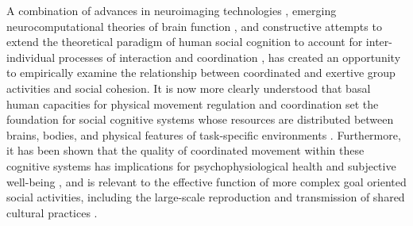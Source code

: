 A combination of advances in neuroimaging technologies \citep{Frith2007}, emerging neurocomputational theories of brain function \citep{Friston2010,Frith2010,Clark2013}, and constructive attempts to extend the theoretical paradigm of human social cognition to account for inter-individual processes of interaction and coordination \citep{Sebanz2006,Dale2014}, has created an opportunity to empirically examine the relationship between coordinated and exertive group activities and social cohesion.  It is now more clearly understood that basal human capacities for physical movement regulation and coordination set the foundation for social cognitive systems whose resources are distributed between brains, bodies, and physical features of task-specific environments \citep{Hutchins2000,Kirsh2006,Semin2008,Semin2012,Coey2012}.  Furthermore, it has been shown that the quality of coordinated movement within these cognitive systems has implications for psychophysiological health and subjective well-being \citep{Wheatley2012}, and is relevant to the effective function of more complex goal oriented social activities, including the large-scale reproduction and transmission of shared cultural practices \citep{Dunbar2012,Roepstorff2010,Claidiere2014,Launay2016}.

